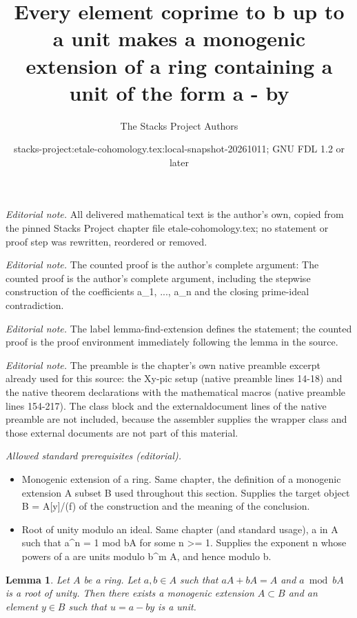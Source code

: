 \documentclass[10pt,a4paper]{amsart}
\title{Every element coprime to b up to a unit makes a monogenic extension of a ring containing a unit of the form a - by}
\author{The Stacks Project Authors}
\date{stacks-project:etale-cohomology.tex:local-snapshot-20261011; GNU FDL 1.2 or later}
\theoremstyle{plain}
\newtheorem{lemma}[subsection]{Lemma}
\theoremstyle{definition}
\theoremstyle{remark}
\numberwithin{equation}{subsection}
\begin{document}
\maketitle
\noindent\textit{Editorial note.} All delivered mathematical text is the author's own, copied from the pinned Stacks Project chapter file etale-cohomology.tex; no statement or proof step was rewritten, reordered or removed.\par\medskip
\noindent\textit{Editorial note.} The counted proof is the author's complete argument: The counted proof is the author's complete argument, including the stepwise construction of the coefficients a\_1, ..., a\_n and the closing prime-ideal contradiction.\par\medskip
\noindent\textit{Editorial note.} The label lemma-find-extension defines the statement; the counted proof is the proof environment immediately following the lemma in the source.\par\medskip
\noindent\textit{Editorial note.} The preamble is the chapter's own native preamble excerpt already used for this source: the Xy-pic setup (native preamble lines 14-18) and the native theorem declarations with the mathematical macros (native preamble lines 154-217). The class block and the externaldocument lines of the native preamble are not included, because the assembler supplies the wrapper class and those external documents are not part of this material.\par\medskip
\noindent\textit{Allowed standard prerequisites (editorial).}\begin{itemize}
\item Monogenic extension of a ring. Same chapter, the definition of a monogenic extension A subset B used throughout this section. Supplies the target object B = A[y]/(f) of the construction and the meaning of the conclusion.
\item Root of unity modulo an ideal. Same chapter (and standard usage), a in A such that a\textasciicircum{}n = 1 mod bA for some n >= 1. Supplies the exponent n whose powers of a are units modulo b\textasciicircum{}m A, and hence modulo b.
\end{itemize}\medskip
\begin{lemma}
\label{lemma-find-extension}
Let $A$ be a ring. Let $a, b \in A$ such that
$aA + bA = A$ and $a \bmod bA$ is a root of unity.
Then there exists a monogenic extension $A \subset B$
and an element $y \in B$ such that $u = a - by$ is a unit.
\end{lemma}
\end{document}
